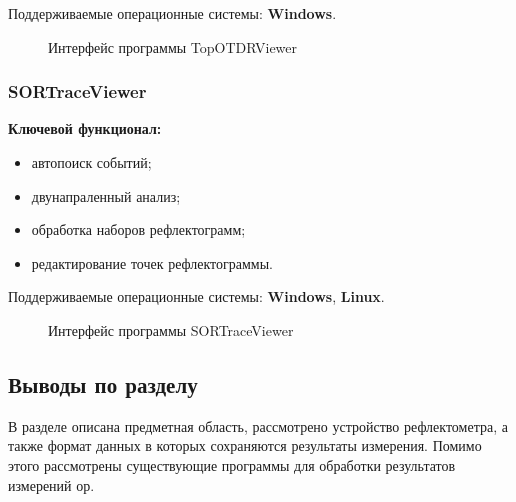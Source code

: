 Поддерживаемые операционные системы: \textbf{Windows}.

\begin{figure}[H]
  \caption{Интерфейс программы TopOTDRViewer}
  \label{ris:topotdrviewer}
\end{figure}

\subsubsection{SORTraceViewer}

\textbf{Ключевой функционал:} \cite{web:sortraceviewer}
\begin{itemize}
  \item автопоиск событий;
  \item двунапраленный анализ;
  \item обработка наборов рефлектограмм;
  \item редактирование точек рефлектограммы.
\end{itemize}

Поддерживаемые операционные системы: \textbf{Windows}, \textbf{Linux}.

\begin{figure}[H]
  \caption{Интерфейс программы SORTraceViewer}
  \label{ris:sortraceviewer}
\end{figure}

\subsection{Выводы по разделу}

В разделе описана предметная область, рассмотрено устройство рефлектометра, а также формат данных в которых сохраняются результаты измерения. Помимо этого рассмотрены существующие программы для обработки результатов измерений \acrshort{ор}.
